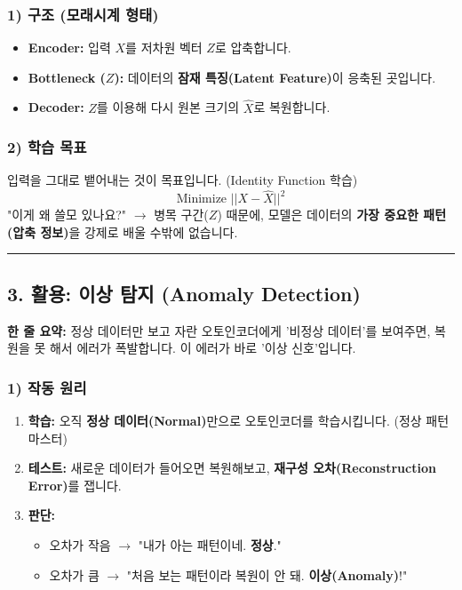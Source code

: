 \documentclass[11pt,a4paper]{book}
\theoremstyle{definition}
\begin{document}
\subsubsection*{1) 구조 (모래시계 형태)}
\begin{itemize}
    \item \textbf{Encoder:} 입력 $X$를 저차원 벡터 $Z$로 압축합니다.
    \item \textbf{Bottleneck ($Z$):} 데이터의 \textbf{잠재 특징(Latent Feature)}이 응축된 곳입니다.
    \item \textbf{Decoder:} $Z$를 이용해 다시 원본 크기의 $\hat{X}$로 복원합니다.
\end{itemize}

\subsubsection*{2) 학습 목표}
입력을 그대로 뱉어내는 것이 목표입니다. (Identity Function 학습)
$$ \text{Minimize } || X - \hat{X} ||^2 $$
"이게 왜 쓸모 있나요?" $\rightarrow$ 병목 구간($Z$) 때문에, 모델은 데이터의 \textbf{가장 중요한 패턴(압축 정보)}을 강제로 배울 수밖에 없습니다.

\vspace{0.5cm}\hrule\vspace{0.5cm}

\subsection{3. 활용: 이상 탐지 (Anomaly Detection)}

\begin{conceptbox}[title={개념 3: 모르는 건 못 그린다}]
\textbf{한 줄 요약:} 정상 데이터만 보고 자란 오토인코더에게 '비정상 데이터'를 보여주면, 복원을 못 해서 에러가 폭발합니다. 이 에러가 바로 '이상 신호'입니다.
\end{conceptbox}

\subsubsection*{1) 작동 원리}
\begin{enumerate}
    \item \textbf{학습:} 오직 \textbf{정상 데이터(Normal)}만으로 오토인코더를 학습시킵니다. (정상 패턴 마스터)
    \item \textbf{테스트:} 새로운 데이터가 들어오면 복원해보고, \textbf{재구성 오차(Reconstruction Error)}를 잽니다.
    \item \textbf{판단:}
    \begin{itemize}
        \item 오차가 작음 $\rightarrow$ "내가 아는 패턴이네. \textbf{정상}."
        \item 오차가 큼 $\rightarrow$ "처음 보는 패턴이라 복원이 안 돼. \textbf{이상(Anomaly)}!"
    \end{itemize}
\end{enumerate}
\end{document}
